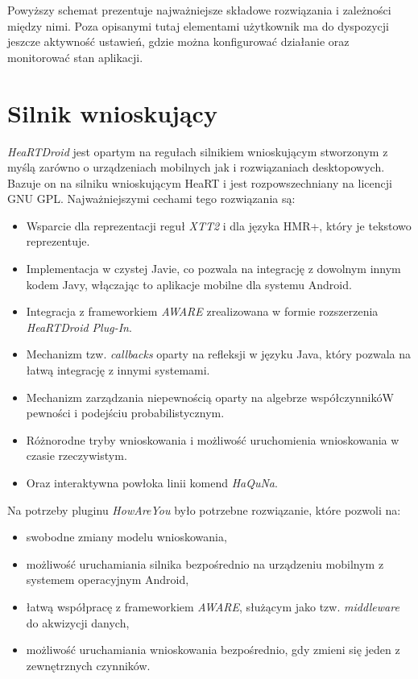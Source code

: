 Powyższy schemat prezentuje najważniejsze składowe rozwiązania i zależności między nimi. Poza opisanymi tutaj elementami użytkownik ma do dyspozycji jeszcze aktywność ustawień, gdzie można konfigurować działanie oraz monitorować stan aplikacji.



\section{Silnik wnioskujący}
\label{sec:silnikWnioskujacy}

\textit{HeaRTDroid} jest opartym na regułach silnikiem wnioskującym stworzonym z myślą zarówno o urządzeniach mobilnych jak i rozwiązaniach desktopowych. Bazuje on na silniku wnioskującym HeaRT i jest rozpowszechniany na licencji GNU GPL. Najważniejszymi cechami tego rozwiązania są\cite{heartdroid}:

\begin{itemize}
	\item Wsparcie dla reprezentacji reguł \textit{XTT2} i dla języka HMR+, który je tekstowo reprezentuje.
	
	\item Implementacja w czystej Javie, co pozwala na integrację z dowolnym innym kodem Javy, włączając to aplikacje mobilne dla systemu Android.
	
	\item Integracja z frameworkiem \textit{AWARE} zrealizowana w formie rozszerzenia \textit{HeaRTDroid Plug-In}.
	
	\item Mechanizm tzw. \textit{callbacks} oparty na refleksji w języku Java, który pozwala na łatwą integrację z innymi systemami.
	
	\item Mechanizm zarządzania niepewnością oparty na algebrze współczynnikóW pewności i podejściu probabilistycznym.
	
	\item Różnorodne tryby wnioskowania i możliwość uruchomienia wnioskowania w czasie rzeczywistym.
	
	\item Oraz interaktywna powłoka linii komend \textit{HaQuNa}\cite{heartdroid}.
\end{itemize}

Na potrzeby pluginu \textit{HowAreYou} było potrzebne rozwiązanie, które pozwoli na: 
\begin{itemize}
	\item swobodne zmiany modelu wnioskowania,
	
	\item możliwość uruchamiania silnika bezpośrednio na urządzeniu mobilnym z systemem operacyjnym Android,
	
	\item łatwą współpracę z frameworkiem \textit{AWARE}, służącym jako tzw. \textit{middleware} do akwizycji danych,
	
	\item możliwość uruchamiania wnioskowania bezpośrednio, gdy zmieni się jeden z zewnętrznych czynników.
\end{itemize}

